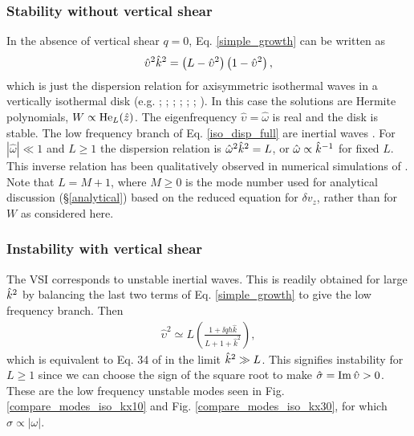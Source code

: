 \subsubsection{Stability without vertical shear}\label{stable_novshear}
In the absence of vertical shear $q=0$, Eq. \ref{simple_growth} can be
written as \begin{align}
  \hat{\upsilon}^2\hat{k}^2 =
  \left(L-\hat{\upsilon}^2\right)\left(1-\hat{\upsilon}^2\right), \label{iso_disp_full}
\end{align}
which is just the dispersion relation for axisymmetric isothermal waves in a
vertically isothermal disk (e.g. \citealt{okazaki87}; \citealt{takeuchi98}; \citealt{tanaka02}; 
\citealt{zhang06}; \citealt{ogilvie13}; \citealt{barker14}; ). In 
this case the solutions are Hermite polynomials, $W\propto
\operatorname{He}_L(\hat{z})$.  The eigenfrequency $\hat{\upsilon} = \hat{\omega}$ is real and the disk
is stable. The low frequency branch of Eq. \ref{iso_disp_full} are 
inertial waves \citep{balbus03}. For 
$|\hat{\omega}|\ll 1$ and $L\geq 1$ the dispersion relation is
$\hat{\omega}^2\hat{k}^2 = L$, or $\hat{\omega}\propto \hat{k}^{-1}$ for
fixed $L$. This inverse relation has been qualitatively
observed in numerical simulations of \cite{stoll14}. 
Note that $L=M+1$, where $M\geq 0$ is the mode number used for analytical
discussion (\S\ref{analytical}) based on the reduced equation for
$\delta v_z$, rather than for $W$ as considered here. 

\subsubsection{Instability with vertical shear}
The VSI corresponds to unstable inertial waves. This
is readily obtained for large $\hat{k}^2$ by balancing
the last two terms of Eq. \ref{simple_growth} to give the low
frequency branch. Then 
\begin{align}
  \hat{\upsilon}^2 \simeq L\left(\frac{1+\ii q h
       \hat{k}}{L+1+\hat{k}^2}\right), \label{simple_growth2}
\end{align}
which is equivalent to Eq. 34 of  in the limit
$\hat{k}^2\gg L$. This signifies instability for
$L\geq1$ since we can choose the sign 
of the square root to make $\hat{\sigma} = \operatorname{Im}\hat{\upsilon}>0$.  These
are the low frequency unstable modes seen in
Fig. \ref{compare_modes_iso_kx10} and
Fig. \ref{compare_modes_iso_kx30}, for which $\sigma\propto|\omega|$.  

